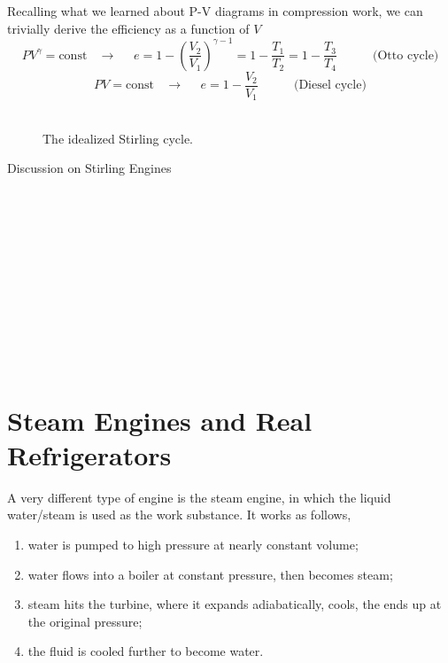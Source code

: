 Recalling what we learned about P-V diagrams in compression work, we can trivially derive the efficiency as a function of $V$
\begin{equation}
PV^{\gamma} = \text{const} ~~~~\rightarrow~~~~~~ e = 1-(\frac{V_2}{V_1})^{\gamma-1} 
                                                   = 1-\frac{T_1}{T_2} 
                                                   = 1-\frac{T_3}{T_4}~~~~~~~~~~~~~ \text{(Otto cycle)}
\end{equation}
\begin{equation}
PV = \text{const} ~~~~\rightarrow~~~~~~ e = 1-\frac{V_2}{V_1}  ~~~~~~~~~~~~~ \text{(Diesel cycle)}
\end{equation}
\\
\begin{figure}[ht]
\centering
{}
\caption{The idealized Stirling cycle.}
\end{figure}



Discussion on Stirling Engines
\\\\\\\\\\\\\\\\\\\\\\\\
\section{Steam Engines and Real Refrigerators}
A very different type of engine is the steam engine, in which the liquid water/steam is used as the work substance. It works as follows,
\begin{enumerate}
\item water is pumped to high pressure at nearly constant volume;
\item water flows into a boiler at constant pressure, then becomes steam;
\item steam hits the turbine, where it expands adiabatically, cools, the ends up at the original pressure;
\item the fluid is cooled further to become water.
\end{enumerate}

